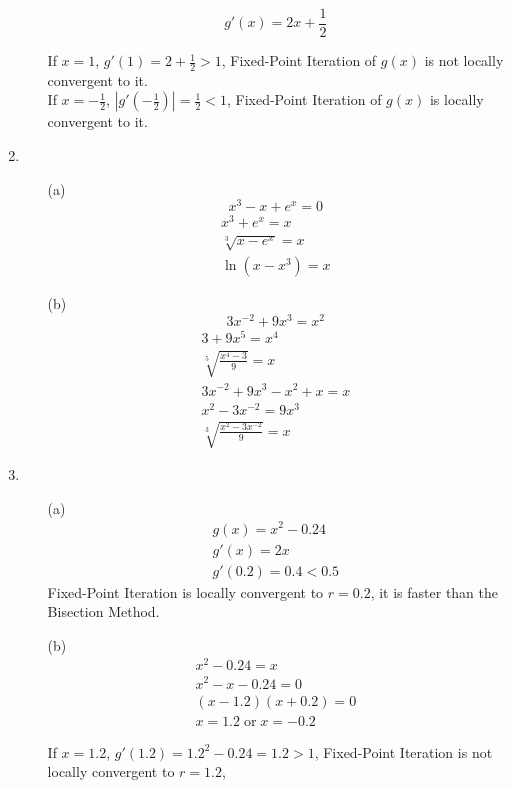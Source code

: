 \documentclass[UTF8]{ctexart}
\begin{document}
\begin{enumerate}
\begin{itemize}
\[
	g'(x) = 2x + \frac{1}{2}
\]

If $x = 1$, $g'(1) = 2 + \frac{1}{2} > 1$, Fixed-Point Iteration of $g(x)$ is not locally convergent to it. \\
If $x = -\frac{1}{2}$, $|g'(-\frac{1}{2})| = \frac{1}{2} < 1$, Fixed-Point Iteration of $g(x)$ is locally convergent to it.
\end{itemize}

\item \begin{itemize}
\item[(a)] 
\[
	x^3 - x + e^x = 0
\]
\begin{gather*}
x^3 + e^x = x \\
\sqrt[3]{x - e^x} = x \\
\ln{(x - x^3)} = x
\end{gather*}

\item[(b)]
\[
	3x^{-2} + 9x^3 = x^2
\]
\begin{gather*}
3 + 9x^5 = x^4 \\
\sqrt[5]{\frac{x^4 - 3}{9}} = x \\
3x^{-2} + 9x^3 - x^2 + x = x \\
x^2 - 3x^{-2} = 9x^3 \\
\sqrt[3]{\frac{x^2 - 3x^{-2}}{9}} = x
\end{gather*}

\end{itemize}

\item \begin{itemize}
\item[(a)]
\begin{gather*}
g(x) = x^2 - 0.24 \\
g'(x) = 2x \\
g'(0.2) = 0.4 < 0.5
\end{gather*}
Fixed-Point Iteration is locally convergent to $r = 0.2$, it is faster than the Bisection Method.

\item[(b)]
\begin{gather*}
x^2 - 0.24 = x \\
x^2 - x - 0.24 = 0 \\
(x - 1.2)(x + 0.2) = 0 \\
x = 1.2 \; \text{or} \; x = -0.2
\end{gather*}

If $x = 1.2$, $g'(1.2) = 1.2^2 - 0.24 = 1.2 > 1$, Fixed-Point Iteration is not locally convergent to $r = 1.2$,


\end{itemize}
\end{enumerate}
\end{document}
